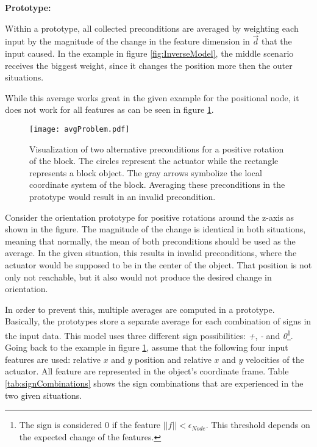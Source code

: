 \textbf{Prototype:}

Within a prototype, all collected preconditions are averaged by weighting each input by the magnitude of the change in the feature dimension in $\vec{d}$ that the input caused.
In the example in figure \ref{fig:InverseModel}, the middle scenario receives the biggest weight, since it changes the position more then the outer situations. 

While this average works great in the given example for the positional node, it does not work for all features as can be seen in figure \ref{fig:avgProblem}.

\begin{figure}
	\centering
	\texttt{[image: avgProblem.pdf]}
	\caption{Visualization of two alternative preconditions for a positive rotation of the block. The circles represent the actuator while the rectangle represents a block object. The gray arrows symbolize the local coordinate system of the block. Averaging these preconditions in the prototype would result in an invalid precondition.} 
	\label{fig:avgProblem}
\end{figure}

Consider the orientation prototype for positive rotations around the z-axis as shown in the figure. The magnitude of the change is identical in both situations, meaning that normally, the mean of both preconditions should be used as the average. In the given situation, this results in invalid preconditions, where the actuator would be supposed to be in the center of the object. That position is not only not reachable, but it also would not produce the desired change in orientation. 

In order to prevent this, multiple averages are computed in a prototype. Basically, the prototypes store a separate average for each combination of signs in the input data. This model uses three different sign possibilities: \textit{+}, \textit{-} and \textit{0}\footnote{The sign is considered 0 if the feature $||f|| < \epsilon_{Node}$. This threshold depends on the expected change of the features.}.
Going back to the example in figure \ref{fig:avgProblem}, assume that the following four input features are used: relative $x$ and $y$ position and relative $x$ and $y$ velocities of the actuator. All feature are represented in the object's coordinate frame. Table \ref{tab:signCombinations} shows the sign combinations that are experienced in the two given situations. 

